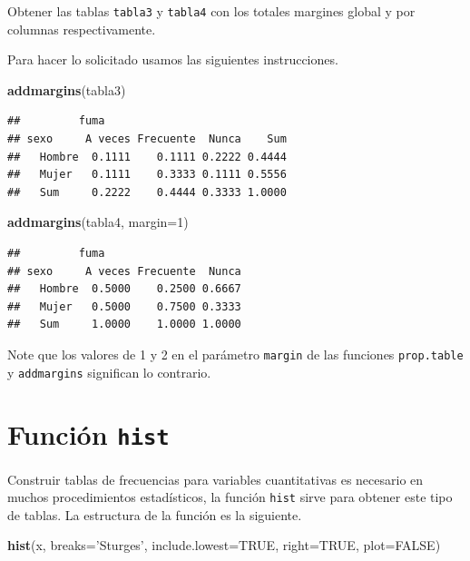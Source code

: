 \documentclass[10pt,]{krantz}
\makeatletter
\newenvironment{Shaded}{\begin{snugshade}}{\end{snugshade}}
\newcommand{\KeywordTok}[1]{\textcolor[rgb]{0.13,0.29,0.53}{\textbf{{#1}}}}
\newcommand{\DataTypeTok}[1]{\textcolor[rgb]{0.13,0.29,0.53}{{#1}}}
\newcommand{\DecValTok}[1]{\textcolor[rgb]{0.00,0.00,0.81}{{#1}}}
\newcommand{\StringTok}[1]{\textcolor[rgb]{0.31,0.60,0.02}{{#1}}}
\newcommand{\OtherTok}[1]{\textcolor[rgb]{0.56,0.35,0.01}{{#1}}}
\newcommand{\NormalTok}[1]{{#1}}
\newenvironment{kframe}{%
\medskip{}
\setlength{\fboxsep}{.8em}
 \def\at@end@of@kframe{}%
 \ifinner\ifhmode%
  \def\at@end@of@kframe{\end{minipage}}%
  \begin{minipage}{\columnwidth}%
 \fi\fi%
 \def\FrameCommand##1{\hskip\@totalleftmargin \hskip-\fboxsep
 \colorbox{shadecolor}{##1}\hskip-\fboxsep
     \hskip-\linewidth \hskip-\@totalleftmargin \hskip\columnwidth}%
 \MakeFramed {\advance\hsize-\width
   \@totalleftmargin\z@ \linewidth\hsize
   \@setminipage}}%
 {\par\unskip\endMakeFramed%
 \at@end@of@kframe}
\renewenvironment{Shaded}{\begin{kframe}}{\end{kframe}}
\let\BeginKnitrBlock\begin \let\EndKnitrBlock\end
\makeatother
\begin{document}
Obtener las tablas \texttt{tabla3} y \texttt{tabla4} con los totales
margines global y por columnas respectivamente.

Para hacer lo solicitado usamos las siguientes instrucciones.

\begin{Shaded}
\begin{Highlighting}[]
\KeywordTok{addmargins}\NormalTok{(tabla3)}
\end{Highlighting}
\end{Shaded}

\begin{verbatim}
##         fuma
## sexo     A veces Frecuente  Nunca    Sum
##   Hombre  0.1111    0.1111 0.2222 0.4444
##   Mujer   0.1111    0.3333 0.1111 0.5556
##   Sum     0.2222    0.4444 0.3333 1.0000
\end{verbatim}

\begin{Shaded}
\begin{Highlighting}[]
\KeywordTok{addmargins}\NormalTok{(tabla4, }\DataTypeTok{margin=}\DecValTok{1}\NormalTok{)}
\end{Highlighting}
\end{Shaded}

\begin{verbatim}
##         fuma
## sexo     A veces Frecuente  Nunca
##   Hombre  0.5000    0.2500 0.6667
##   Mujer   0.5000    0.7500 0.3333
##   Sum     1.0000    1.0000 1.0000
\end{verbatim}

\BeginKnitrBlock{rmdwarning}
Note que los valores de 1 y 2 en el parámetro \texttt{margin} de las
funciones \texttt{prop.table} y \texttt{addmargins} significan lo
contrario.
\EndKnitrBlock{rmdwarning}

\section{\texorpdfstring{Función \texttt{hist}
}{Función hist }}\label{funcion-hist}

Construir tablas de frecuencias para variables cuantitativas es
necesario en muchos procedimientos estadísticos, la función
\texttt{hist} sirve para obtener este tipo de tablas. La estructura de
la función es la siguiente.

\begin{Shaded}
\begin{Highlighting}[]
\KeywordTok{hist}\NormalTok{(x, }\DataTypeTok{breaks=}\StringTok{'Sturges'}\NormalTok{, }\DataTypeTok{include.lowest=}\OtherTok{TRUE}\NormalTok{, }\DataTypeTok{right=}\OtherTok{TRUE}\NormalTok{, }
     \DataTypeTok{plot=}\OtherTok{FALSE}\NormalTok{)}
\end{Highlighting}
\end{Shaded}
\end{document}
